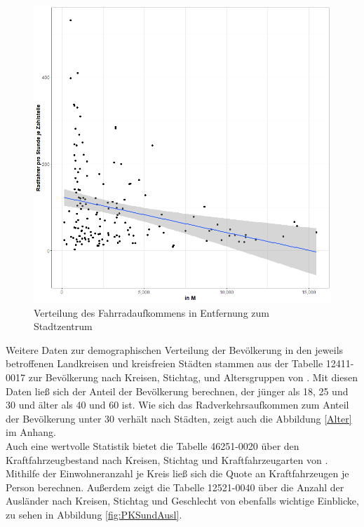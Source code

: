 \documentclass[a4paper,12pt]{thesis}
\begin{document}
\begin{figure}[!ht]
	\centering
	\includegraphics[width=\textwidth]{Plots/plot11.png}
	\caption{Verteilung des Fahrradaufkommens in Entfernung zum Stadtzentrum}
	\label{Stadtzentrum}
\end{figure}

Weitere Daten zur demographischen Verteilung der Bevölkerung in den jeweils betroffenen Landkreisen und kreisfreien Städten stammen aus der Tabelle 12411-0017 zur Bevölkerung nach Kreisen, Stichtag, und Altersgruppen von \cite{Destatis2022_a}. Mit diesen Daten ließ sich der Anteil der Bevölkerung berechnen, der jünger als 18, 25 und 30 und älter als 40 und 60 ist. Wie sich das Radverkehrsaufkommen zum Anteil der Bevölkerung unter 30 verhält nach Städten, zeigt auch die Abbildung \ref{Alter} im Anhang.\\

Auch eine wertvolle Statistik bietet die Tabelle 46251-0020 über den Kraftfahrzeugbestand nach Kreisen, Stichtag und Kraftfahrzeugarten von \cite{Destatis2022b}. Mithilfe der Einwohneranzahl je Kreis ließ sich die Quote an Kraftfahrzeugen je Person berechnen. Außerdem zeigt die Tabelle 12521-0040 über die Anzahl der Ausländer nach Kreisen, Stichtag und Geschlecht von \cite{Destatis2022c} ebenfalls wichtige Einblicke, zu sehen in Abbildung \ref{fig:PKSundAusl}.
\end{document}
